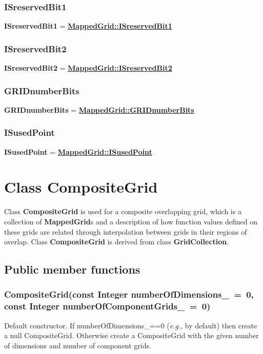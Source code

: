 \documentclass{article}
\begin{document}
  \subsubsection{ISreservedBit1}
  \label{GridCollection::ISreservedBit1}
    \textbf{ISreservedBit1} =
    {\bf{}\hyperref{MappedGrid::ISreservedBit1}{MappedGrid::ISreservedBit1 \rm(\S}{)}{MappedGrid::ISreservedBit1}}

  \subsubsection{ISreservedBit2}
  \label{GridCollection::ISreservedBit2}
    \textbf{ISreservedBit2} =
    {\bf{}\hyperref{MappedGrid::ISreservedBit2}{MappedGrid::ISreservedBit2 \rm(\S}{)}{MappedGrid::ISreservedBit2}}

  \subsubsection{GRIDnumberBits}
  \label{GridCollection::GRIDnumberBits}
    \textbf{GRIDnumberBits} =
    {\bf{}\hyperref{MappedGrid::GRIDnumberBits}{MappedGrid::GRIDnumberBits \rm(\S}{)}{MappedGrid::GRIDnumberBits}}

  \subsubsection{ISusedPoint}
  \label{GridCollection::ISusedPoint}
    \textbf{ISusedPoint} =
    {\bf{}\hyperref{MappedGrid::ISusedPoint}{MappedGrid::ISusedPoint \rm(\S}{)}{MappedGrid::ISusedPoint}}

\section{Class CompositeGrid}
\label{CompositeGrid}

Class \textbf{CompositeGrid} is used for a composite overlapping grid, which
is a collection of \textbf{MappedGrid}s and a description of how function
values defined on these grids are related through interpolation
between grids in their regions of overlap.  Class \textbf{CompositeGrid}
is derived from class \textbf{GridCollection}.

\subsection{Public member functions}
\label{CompositeGrid::PublicMemberFunctions}

  \subsubsection{CompositeGrid(const Integer numberOfDimensions\_~=~0,  const Integer numberOfComponentGrids\_~=~0)}
  \label{CompositeGrid::CompositeGrid(numberOfDimensions_,numberOfComponentGrids_)}
    Default constructor.
    If numberOfDimensions\_==0 ({\sl{}e.g.}, by default) then create a null CompositeGrid.
    Otherwise create a CompositeGrid with the given number of dimensions and number of component grids.
\end{document}
